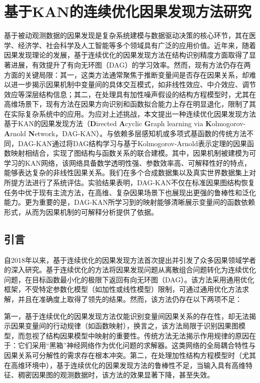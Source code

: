 \chapter{基于KAN的连续优化因果发现方法研究}
基于被动观测数据的因果发现是复杂系统建模与数据驱动决策的核心环节，其在医学、经济学、社会科学及人工智能等多个领域具有广泛的应用价值。近年来，随着因果发现理论的发展，基于连续优化的因果发现方法在结构识别精度方面取得了显著进展，有效提升了有向无环图（DAG）的学习效率。然而，现有方法仍存在两方面的关键局限：其一，这类方法通常聚焦于推断变量间是否存在因果关系，却难以进一步揭示因果机制中变量间的具体交互模式，如非线性效应、中介效应、调节效应等深层结构信息；其二，在处理具有加性噪声假设的结构方程模型时，尤其在高维场景下，现有方法在因果方向识别和函数拟合能力上存在明显退化，限制了其在实际复杂系统中的应用。为应对上述挑战，本文提出一种连续优化因果发现方法\pozhehao{}基于KAN的因果发现方法（\textbf{D}irected \textbf{A}cyclic \textbf{G}raph learning via \textbf{K}olmogorov-\textbf{A}rnold \textbf{N}etwork，DAG-KAN）。与依赖多层感知机或多项式基函数的传统方法不同，DAG-KAN通过将DAG结构学习与基于Kolmogorov-Arnold表示定理的因果函数映射相结合，实现了图结构与函数关系的联合建模。其中，因果机制被建模为可学习的KAN网络，该网络具备数学透明性强、参数效率高、可解释性好的特点，能够表达复杂的非线性因果关系。我们在多个合成数据集以及真实世界数据集上对所提方法进行了系统评估。实验结果表明，DAG-KAN不仅在标准因果图结构恢复任务中优于现有主流方法，在高维、复杂因果场景下也展现出更强的鲁棒性和泛化能力。更为重要的是，DAG-KAN所学习到的映射能够清晰展示变量间的函数依赖形式，从而为因果机制的可解释分析提供了依据。

\section{引言}

自2018年以来，基于连续优化的因果发现方法首次提出并引发了众多因果领域学者的深入研究。基于连续优化的方法将因果发现问题从离散组合问题转化为连续优化问题，在目标函数最小化的极限下返回有向无环图（DAG）。该方法采用通用优化框架，不受特定参数化模型（如加性或线性模型）限制，可通过通用优化方法求解，并且在准确度上取得了领先的结果。然而，该方法仍存在以下两项不足：

第一，基于连续优化的因果发现方法仅能识别变量间因果关系的存在性，却无法揭示因果变量间的行动规律（如函数映射），换言之，该方法局限于识别因果图模型，而忽视了结构因果模型中映射的重要性。传统方法无法揭示作用规律的原因在于：它们采用“黑箱”神经网络作为优化问题的求解器。这类网络的全局耦合特性与因果关系可分解性的需求存在根本冲突。第二，在处理加性结构方程模型时（尤其在高维环境中），基于连续优化的因果发现方法的鲁棒性不足，当输入具有高维特征、稠密因果图的观测数据时，该方法的效果显著下降，甚至失效。


